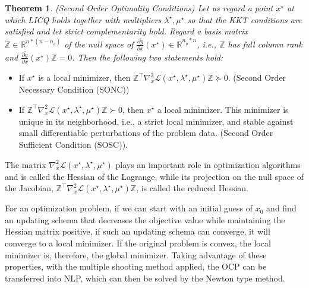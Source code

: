 \documentclass  [
  paper    = a4,
  BCOR     = 10mm,
  twoside,
  fontsize = 12pt,
  fleqn,
  toc      = bibnumbered,
  toc      = listofnumbered,
  numbers  = noendperiod,
  headings = normal,
  listof   = leveldown,
  version  = 3.03
]                                       {scrreprt}
\newcommand{\<}{\langle}
\renewcommand{\>}{\rangle}
\newtheorem{theorem}{Theorem}
\begin{document}
\begin{theorem}(Second Order Optimality Conditions) Let us regard a point $x^\star$ at which LICQ holds together with
	multipliers $\lambda^\star, \mu^\star$ so that the KKT conditions are satisfied and let strict complementarity hold. Regard a basis matrix $\mathbb{Z} \in  \mathbb{R}^{n*(n-n_g)}$ of the null space of $\frac{\partial \tilde{g}}{\partial x} (x^\star) \in \mathbb{R}^{n_{\tilde{g}} *n}$, i.e., $\mathbb{Z}$ has full column rank and $\frac{\partial \tilde{g}}{\partial x} (x^\star)\mathbb{Z} =0$. Then the following two statements hold:
\end{theorem}
\begin{itemize}
	\item  If $x^\star$ is a local minimizer, then $\mathbb{Z}^\top \nabla_x^2 \mathcal{L}(x^\star, \lambda^\star, \mu^\star)\mathbb{Z} \succeq 0 $. (Second Order Necessary Condition (SONC))
	\item  If $\mathbb{Z}^\top \nabla_x^2 \mathcal{L}(x^\star, \lambda^\star, \mu^\star)\mathbb{Z} \succ 0 $, then $x^\star$ a local minimizer. This minimizer is unique in its neighborhood, i.e., a strict local minimizer, and stable against small differentiable perturbations of the problem data. (Second Order Sufficient Condition (SOSC)).
\end{itemize}


The matrix $\nabla_x^2 \mathcal{L}(x^\star, \lambda^\star, \mu^\star)$ plays an important role in optimization algorithms and is called the Hessian of the Lagrange, while its projection on the null space of the Jacobian, $\mathbb{Z}^\top \nabla_x^2 \mathcal{L}(x^\star, \lambda^\star, \mu^\star)\mathbb{Z}$, is called the reduced Hessian. 

For an optimization problem, if we can start with an initial guess of $x_0$ and find an updating schema that decreases the objective value while maintaining the Hessian matrix positive, if such an updating schema can converge, it will converge to a local minimizer. If the original problem is convex, the local minimizer is, therefore, the global minimizer. Taking advantage of these properties, with the multiple shooting method applied, the OCP can be transferred into NLP, which can then be solved by the Newton type method.
\end{document}
